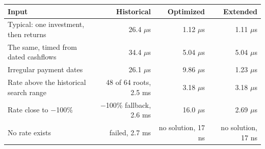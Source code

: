 \begin{tabular}{lrrr}
\toprule
Input & Historical & Optimized & Extended \\
\midrule
Typical: one investment, then returns & 26.4 $\mu$s & 1.12 $\mu$s & 1.11 $\mu$s \\
The same, timed from dated cashflows & 34.4 $\mu$s & 5.04 $\mu$s & 5.04 $\mu$s \\
Irregular payment dates & 26.1 $\mu$s & 9.86 $\mu$s & 1.23 $\mu$s \\
Rate above the historical search range & 48 of 64 roots, 2.5 ms & 3.18 $\mu$s & 3.18 $\mu$s \\
Rate close to $-$100\% & $-$100\% fallback, 2.6 ms & 16.0 $\mu$s & 2.69 $\mu$s \\
No rate exists & failed, 2.7 ms & no solution, 17 ns & no solution, 17 ns \\
\bottomrule
\end{tabular}
